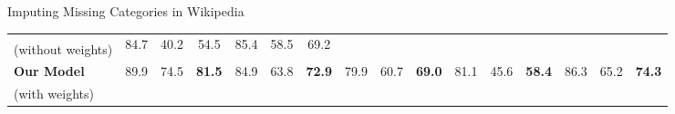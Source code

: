 \documentclass[10pt]{beamer}
\newcommand{\highest}[1]{\textbf{#1}}
\begin{document}
\begin{frame}{Imputing Missing Categories in Wikipedia }
\begin{table}[h!]
\begin{center}
\begin{tabular}{l ccc@{\hskip 3mm} ccc@{\hskip 3mm} ccc@{\hskip 3mm} ccc@{\hskip 3mm} ccc}
	& \multirow{2}{*}{84.7}   & \multirow{2}{*}{40.2}  & \multirow{2}{*}{54.5}
	& \multirow{2}{*}{85.4}   & \multirow{2}{*}{58.5}  & \multirow{2}{*}{69.2}
	\\ 
	(without weights) & & & & & & & & & & & & & &  & \\
	\addlinespace[1mm]
	\textbf{Our Model}
	& \multirow{2}{*}{89.9}   & \multirow{2}{*}{74.5}  & \multirow{2}{*}{\highest{81.5}}
	& \multirow{2}{*}{84.9}   & \multirow{2}{*}{63.8} & \multirow{2}{*}{\highest{72.9}}
	& \multirow{2}{*}{79.9}   & \multirow{2}{*}{60.7}  & \multirow{2}{*}{\highest{69.0}}
	& \multirow{2}{*}{81.1}   & \multirow{2}{*}{45.6} & \multirow{2}{*}{\highest{58.4}}
	& \multirow{2}{*}{86.3}   & \multirow{2}{*}{65.2}  & \multirow{2}{*}{\highest{74.3}}
	\\ 
	(with weights) & & & & & & & & & & & & & &  & \\
	\bottomrule         
	\end{tabular}
	\end{center}
	\end{table}


\end{frame}
\end{document}
